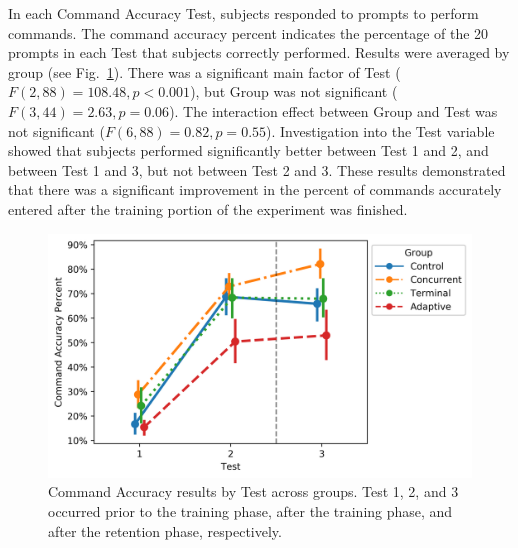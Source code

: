 In each Command Accuracy Test, subjects responded to prompts to perform commands.
The command accuracy percent indicates the percentage of the 20 prompts in each Test that subjects correctly performed.
Results were averaged by group (see Fig.~\ref{figure:label7}).
There was a significant main factor of Test ($F(2, 88) = 108.48, p < 0.001$), but Group was not significant ($F(3, 44) = 2.63, p = 0.06$).
The interaction effect between Group and Test was not significant ($F(6, 88) = 0.82, p = 0.55$).
Investigation into the Test variable showed that subjects performed significantly better between Test 1 and 2, and between Test 1 and 3, but not between Test 2 and 3.
These results demonstrated that there was a significant improvement in the percent of commands accurately entered after the training portion of the experiment was finished.

\begin{figure}[hbt!]
\centering
\includegraphics[height=.4\textwidth]{figures/CodeAccuracySuccess_session}
\caption{\label{figure:label7} Command Accuracy results by Test across groups.
Test 1, 2, and 3 occurred prior to the training phase, after the training phase, and after the retention phase, respectively.}
\end{figure}

